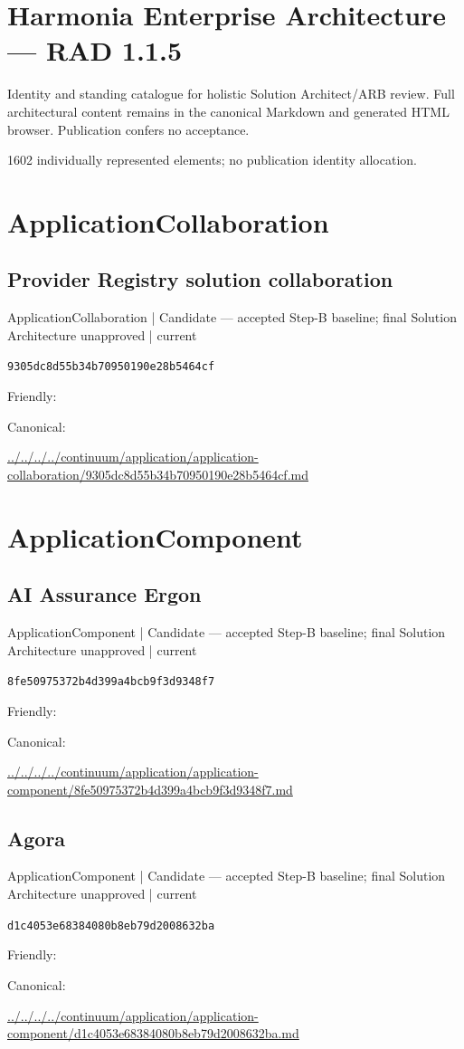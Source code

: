 \documentclass[10pt,a4paper]{article}
\begin{document}
\section*{Harmonia Enterprise Architecture — RAD 1.1.5}
Identity and standing catalogue for holistic Solution Architect/ARB review. Full architectural content remains in the canonical Markdown and generated HTML browser. Publication confers no acceptance.\par
1602 individually represented elements; no publication identity allocation.\par
\section*{ApplicationCollaboration}
\subsection*{Provider Registry solution collaboration}
{\small ApplicationCollaboration | Candidate — accepted Step-B baseline; final Solution Architecture unapproved | current}\par
\texttt{9305dc8d55b34b70950190e28b5464cf}\par
Friendly: \par
Canonical: \par
{\footnotesize\url{../../../../continuum/application/application-collaboration/9305dc8d55b34b70950190e28b5464cf.md}}\par
\section*{ApplicationComponent}
\subsection*{AI Assurance Ergon}
{\small ApplicationComponent | Candidate — accepted Step-B baseline; final Solution Architecture unapproved | current}\par
\texttt{8fe50975372b4d399a4bcb9f3d9348f7}\par
Friendly: \par
Canonical: \par
{\footnotesize\url{../../../../continuum/application/application-component/8fe50975372b4d399a4bcb9f3d9348f7.md}}\par
\subsection*{Agora}
{\small ApplicationComponent | Candidate — accepted Step-B baseline; final Solution Architecture unapproved | current}\par
\texttt{d1c4053e68384080b8eb79d2008632ba}\par
Friendly: \par
Canonical: \par
{\footnotesize\url{../../../../continuum/application/application-component/d1c4053e68384080b8eb79d2008632ba.md}}\par
\end{document}
